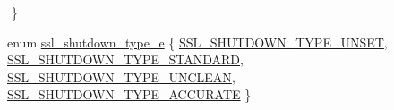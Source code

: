 \begin{DoxyCompactItemize}
$$ \}
\item 
enum \hyperlink{group__MOD__SSL__PRIVATE_gaf8cd4eab3428dc335a1ebbfc8aa18b1b}{ssl\+\_\+shutdown\+\_\+type\+\_\+e} \{ \hyperlink{group__MOD__SSL__PRIVATE_ggaf8cd4eab3428dc335a1ebbfc8aa18b1bab61f4e897037d9a221aefba44346bdf4}{S\+S\+L\+\_\+\+S\+H\+U\+T\+D\+O\+W\+N\+\_\+\+T\+Y\+P\+E\+\_\+\+U\+N\+S\+ET}, 
\hyperlink{group__MOD__SSL__PRIVATE_ggaf8cd4eab3428dc335a1ebbfc8aa18b1ba00053036ec523d4659c953a1b43efdd5}{S\+S\+L\+\_\+\+S\+H\+U\+T\+D\+O\+W\+N\+\_\+\+T\+Y\+P\+E\+\_\+\+S\+T\+A\+N\+D\+A\+RD}, 
\hyperlink{group__MOD__SSL__PRIVATE_ggaf8cd4eab3428dc335a1ebbfc8aa18b1ba2c6ec3cda35ee48eaa87cc6999bc3d40}{S\+S\+L\+\_\+\+S\+H\+U\+T\+D\+O\+W\+N\+\_\+\+T\+Y\+P\+E\+\_\+\+U\+N\+C\+L\+E\+AN}, 
\hyperlink{group__MOD__SSL__PRIVATE_ggaf8cd4eab3428dc335a1ebbfc8aa18b1ba5fffa12c872fb6970b5c109bedae534d}{S\+S\+L\+\_\+\+S\+H\+U\+T\+D\+O\+W\+N\+\_\+\+T\+Y\+P\+E\+\_\+\+A\+C\+C\+U\+R\+A\+TE}
 \}
\end{DoxyCompactItemize}
